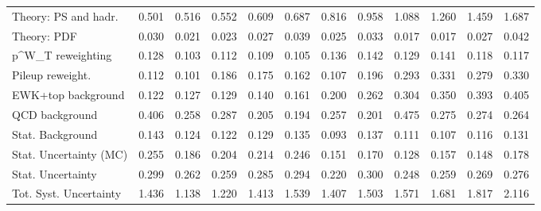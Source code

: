 \begin{tabular}{l|p{0.6cm}p{0.6cm}p{0.6cm}p{0.6cm}p{0.6cm}p{0.6cm}p{0.6cm}p{0.6cm}p{0.6cm}p{0.6cm}p{0.6cm}}
Theory: PS and hadr.                     & 0.501 & 0.516 & 0.552 & 0.609 & 0.687 & 0.816 & 0.958 & 1.088 & 1.260 & 1.459 & 1.687 \\
Theory: PDF                              & 0.030 & 0.021 & 0.023 & 0.027 & 0.039 & 0.025 & 0.033 & 0.017 & 0.017 & 0.027 & 0.042 \\
p^{W}_{T} reweighting                    & 0.128 & 0.103 & 0.112 & 0.109 & 0.105 & 0.136 & 0.142 & 0.129 & 0.141 & 0.118 & 0.117 \\
Pileup reweight.                         & 0.112 & 0.101 & 0.186 & 0.175 & 0.162 & 0.107 & 0.196 & 0.293 & 0.331 & 0.279 & 0.330 \\
EWK+top background                       & 0.122 & 0.127 & 0.129 & 0.140 & 0.161 & 0.200 & 0.262 & 0.304 & 0.350 & 0.393 & 0.405 \\
QCD background                           & 0.406 & 0.258 & 0.287 & 0.205 & 0.194 & 0.257 & 0.201 & 0.475 & 0.275 & 0.274 & 0.264 \\
Stat. Background                         & 0.143 & 0.124 & 0.122 & 0.129 & 0.135 & 0.093 & 0.137 & 0.111 & 0.107 & 0.116 & 0.131 \\
Stat. Uncertainty (MC)                   & 0.255 & 0.186 & 0.204 & 0.214 & 0.246 & 0.151 & 0.170 & 0.128 & 0.157 & 0.148 & 0.178 \\
\hline
Stat. Uncertainty                        & 0.299 & 0.262 & 0.259 & 0.285 & 0.294 & 0.220 & 0.300 & 0.248 & 0.259 & 0.269 & 0.276 \\
\hline
Tot. Syst. Uncertainty                   & 1.436 & 1.138 & 1.220 & 1.413 & 1.539 & 1.407 & 1.503 & 1.571 & 1.681 & 1.817 & 2.116 \\
\hline
\end{tabular}
